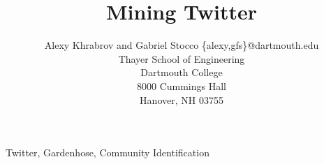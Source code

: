 \documentclass[]{spie}
\begin{document}
\title{Mining Twitter}
	
\author{Alexy Khrabrov and Gabriel Stocco
\skiplinehalf
{\{alexy,gfs\}}@dartmouth.edu\\
Thayer School of Engineering\\
Dartmouth College\\
8000 Cummings Hall\\
Hanover, NH 03755}

\maketitle 

\begin{keywords}
	Twitter, Gardenhose, Community Identification
\end{keywords}





\end{document}
